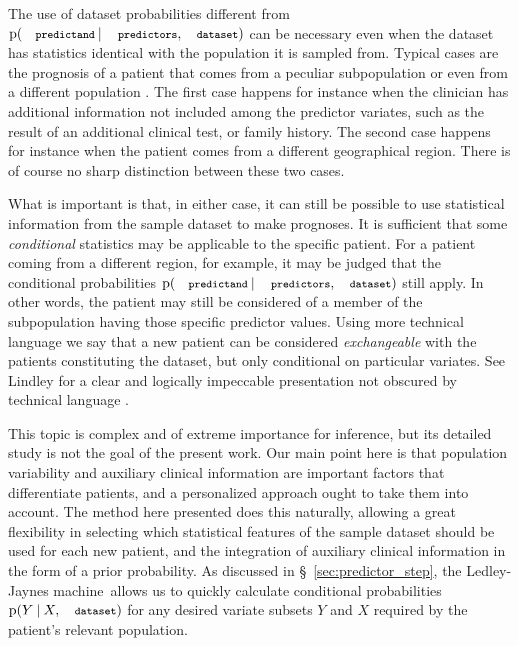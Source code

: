 \documentclass[utf8]{FrontiersinHarvard} %
\newcommand*{\sect}{\S}%
\newcommand*{\sects}{\S\S}%
\newcommand*{\chap}{ch.}%
\newcommand*{\p}{\mathrm{p}}%
\renewcommand*{\|}[1][]{\nonscript\:#1\vert\nonscript\:\mathopen{}}
\newcommand*{\predictors}{\texttt{\footnotesize predictors}}
\newcommand*{\predictand}{\texttt{\footnotesize predictand}}
\newcommand*{\dataset}{\texttt{\footnotesize dataset}}
\newcommand*{\ljm}{Ledley-Jaynes machine}
\begin{document}
\medskip

The use of dataset probabilities different from $\p(\predictand \| \predictors, \dataset)$ can be necessary even when the dataset has statistics identical with the population it is sampled from. Typical cases are the prognosis of a patient that comes from a peculiar subpopulation or even from a different population \citetext{\citealt{lindleyetal1981}; \citealt{quintanaetal2017}; \citealt[\chap~4]{soxetal1988_r2013}; \citealt[\chap~5]{huninketal2001_r2014}}. The first case happens for instance when the clinician has additional information not included among the predictor variates, such as the result of an additional clinical test, or family history. The second case happens for instance when the patient comes from a different geographical region. There is of course no sharp distinction between these two cases.

What is important is that, in either case, it can still be possible to use statistical information from the sample dataset to make prognoses. It is sufficient that some \emph{conditional} statistics may be applicable to the specific patient. For a patient coming from a different region, for example, it may be judged that the conditional probabilities $\p(\predictand \| \predictors, \dataset)$ still apply. In other words, the patient may still be considered of a member of the subpopulation having those specific predictor values. Using more technical language we say that a new patient can be considered \emph{exchangeable} with the patients constituting the dataset, but only conditional on particular variates. See Lindley \citetext{\citeyear[especially around \sects~7.3, 8.6]{lindley2006_r2014}; \citeyear{lindleyetal1981}} for a clear and logically impeccable presentation not obscured by technical language \citetext{more technical references are \citealt[\sects~4.2--4.3]{definetti1930,definetti1937,dawid2013,bernardoetal1994_r2000}; see also \citealt{malinasetal2004_r2016}, \citealt{sprengeretal2021} about confounding and Simpson's paradox, to which this topic is tightly related}.

This topic is complex and of extreme importance for inference, but its detailed study is not the goal of the present work. Our main point here is that population variability and auxiliary clinical information are important factors that differentiate patients, and a personalized approach ought to take them into account. The method here presented does this naturally, allowing a great flexibility in selecting which statistical features of the sample dataset should be used for each new patient, and the integration of auxiliary clinical information in the form of a prior probability. As discussed in \sect~\ref{sec:predictor_step}, the \ljm\ allows us to quickly calculate conditional probabilities $\p(Y\|X, \dataset)$ for any desired variate subsets $Y$ and $X$ required by the patient's relevant population.
\end{document}
